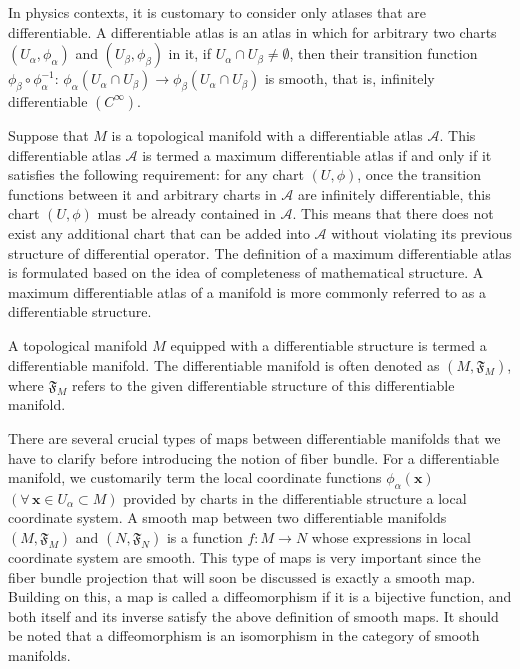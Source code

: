 \par In physics contexts, it is customary to consider only atlases that are differentiable. A differentiable atlas is an atlas in which for arbitrary two charts $\left(U_{\alpha},\phi_{\alpha}\right)$ and $\left(U_{\beta},\phi_{\beta}\right)$ in it, if $U_{\alpha}\cap U_{\beta}\neq\emptyset$, then their transition function $\phi_{\beta}\circ\phi_{\alpha}^{-1}:\,\phi_{\alpha}\left(U_{\alpha}\cap U_{\beta}\right)\rightarrow\phi_{\beta}\left(U_{\alpha}\cap U_{\beta}\right)$ is smooth, that is, infinitely differentiable $\left(C^{\infty}\right)$. 
\par Suppose that $M$ is a topological manifold with a differentiable atlas $\mathcal{A}$. This differentiable atlas $\mathcal{A}$ is termed a maximum differentiable atlas if and only if it satisfies the following requirement: for any chart $\left(U,\phi\right)$, once the transition functions between it and arbitrary charts in $\mathcal{A}$ are infinitely differentiable, this chart $\left(U,\phi\right)$ must be already contained in $\mathcal{A}$. This means that there does not exist any additional chart that can be added into $\mathcal{A}$ without violating its previous structure of differential operator. The definition of a maximum differentiable atlas is formulated based on the idea of completeness of mathematical structure. A maximum differentiable atlas of a manifold is more commonly referred to as a differentiable structure. 
\par A topological manifold $M$ equipped with a differentiable structure is termed a differentiable manifold. The differentiable manifold is often denoted as $\left(M,\mathfrak{F}_{M}\right)$, where $\mathfrak{F}_{M}$ refers to the given differentiable structure of this differentiable manifold. 
\par There are several crucial types of maps between differentiable manifolds that we have to clarify before introducing the notion of fiber bundle. For a differentiable manifold, we customarily term the local coordinate functions $\phi_{\alpha}\left(\mathbf{x}\right)$ $\left(\forall\,\mathbf{x}\in U_{\alpha}\subset M\right)$ provided by charts in the differentiable structure a local coordinate system. A smooth map between two differentiable manifolds $\left(M,\mathfrak{F}_{M}\right)$ and $\left(N,\mathfrak{F}_{N}\right)$ is a function $f:M\rightarrow N$ whose expressions in local coordinate system are smooth. This type of maps is very important since the fiber bundle projection that will soon be discussed is exactly a smooth map. Building on this, a map is called a diffeomorphism if it is a bijective function, and both itself and its inverse satisfy the above definition of smooth maps. It should be noted that a diffeomorphism is an isomorphism in the category of smooth manifolds. 

